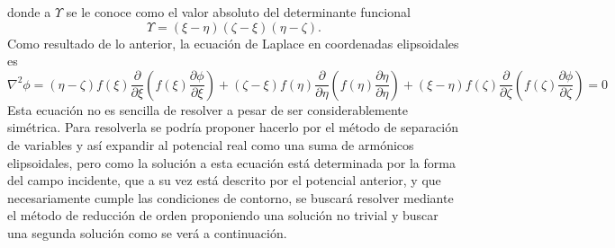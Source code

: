 donde a $\Upsilon$ se le conoce como el valor absoluto del determinante funcional \cite{Kellogg}
\begin{equation}
    \Upsilon=(\xi-\eta)(\zeta-\xi)(\eta-\zeta).
\end{equation}
Como resultado de lo anterior, la ecuación de Laplace en coordenadas elipsoidales es
\begin{equation}
    \nabla^2\phi=(\eta-\zeta)f(\xi)\frac{\partial}{\partial\xi}\left(f(\xi)\frac{\partial\phi}{\partial\xi}\right)+(\zeta-\xi)f(\eta)\frac{\partial}{\partial\eta}\left(f(\eta)\frac{\partial\eta}{\partial\eta}\right)+(\xi-\eta)f(\zeta)\frac{\partial}{\partial\zeta}\left(f(\zeta)\frac{\partial\phi}{\partial\zeta}\right)=0
    \label{laplaceplisoidal}
\end{equation}
Esta ecuación no es sencilla de resolver a pesar de ser considerablemente simétrica. Para resolverla se podría proponer hacerlo por el método de separación de variables y así expandir al potencial real como una suma de armónicos  elipsoidales, pero como la solución a esta ecuación está determinada por la forma del campo
incidente, que a su vez está descrito por el potencial anterior, y que necesariamente cumple las condiciones de contorno, se buscará resolver mediante el método de reducción de orden proponiendo una solución no trivial y buscar una segunda solución como se verá a continuación.\\

